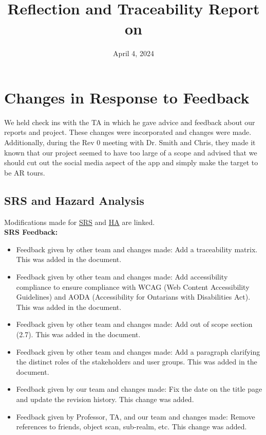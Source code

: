 \documentclass{article}
\title{Reflection and Traceability Report on \progname}
\author{\authname}
\date{April 4, 2024}
\begin{document}
\maketitle

\section{Changes in Response to Feedback}

We held check ins with the TA in which he gave advice and feedback about our reports and project. These changes were incorporated and changes were made. Additionally, during the Rev 0 meeting with Dr. Smith and Chris, they made it known that our project seemed to have too large of a scope and advised that we should cut out the social media aspect of the app and simply make the target to be AR tours.

\subsection{SRS and Hazard Analysis}

Modifications made for \href{https://github.com/russellrd/realm/issues/157}{SRS} and \href{https://github.com/russellrd/realm/pull/143}{HA} are linked.\\

\textbf{SRS Feedback:}
\begin{itemize}
    \item Feedback given by other team and changes made: Add a traceability matrix. This was added in the document.
    \item Feedback given by other team and changes made: Add accessibility compliance to ensure compliance with WCAG (Web Content Accessibility Guidelines) and AODA (Accessibility for Ontarians with Disabilities Act). This was added in the document.
    \item Feedback given by other team and changes made: Add out of scope section (2.7). This was added in the document.
    \item Feedback given by other team and changes made: Add a paragraph clarifying the distinct roles of the stakeholders and user groups. This was added in the document.
    \item Feedback given by our team and changes made: Fix the date on the title page and update the revision history. This change was added.
    \item Feedback given by Professor, TA, and our team and changes made: Remove references to friends, object scan, sub-realm, etc. This change was added.
\end{itemize}
\end{document}
